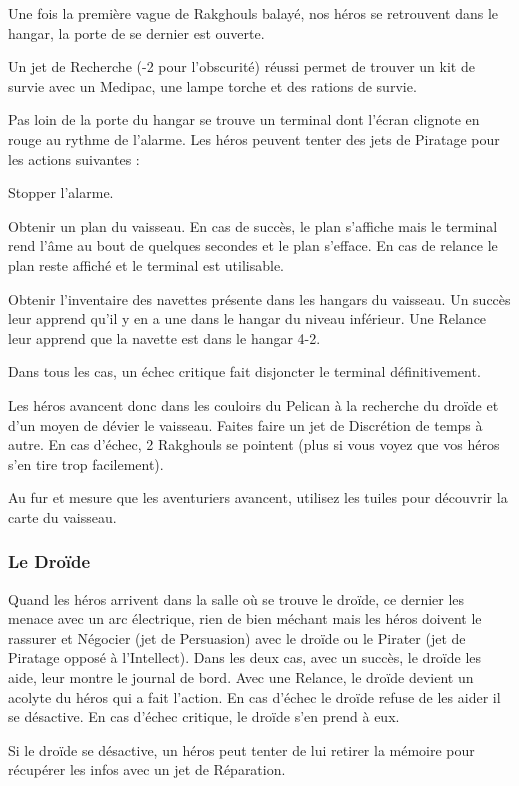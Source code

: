 Une fois la première vague de Rakghouls balayé, nos héros se retrouvent dans le hangar, la porte de se dernier est ouverte.

Un jet de Recherche (-2 pour l’obscurité) réussi permet de trouver un kit de survie avec un Medipac, une lampe torche et des rations de survie.

Pas loin de la porte du hangar se trouve un terminal dont l’écran clignote en rouge au rythme de l’alarme. Les héros peuvent tenter des jets de Piratage pour les actions suivantes :
\begin{rebelist}
	\item Stopper l’alarme. 
	\item Obtenir un plan du vaisseau. En cas de succès, le plan s’affiche mais le terminal rend l’âme au bout de quelques secondes et le plan s’efface. En cas de relance le plan reste affiché et le terminal est utilisable.
	\item Obtenir l’inventaire des navettes présente dans les hangars du vaisseau. Un succès leur apprend qu’il y en a une dans le hangar du niveau inférieur. Une Relance leur apprend que la navette est dans le hangar 4-2.
\end{rebelist}
Dans tous les cas, un échec critique fait disjoncter le terminal définitivement.

Les héros avancent donc dans les couloirs du Pelican à la recherche du droïde et d’un moyen de dévier le vaisseau. Faites faire un jet de Discrétion de temps à autre. En cas d’échec, 2 Rakghouls se pointent (plus si vous voyez que vos héros s’en tire trop facilement).

Au fur et mesure que les aventuriers avancent, utilisez les tuiles pour découvrir la carte du vaisseau.

\subsubsection{Le Droïde}
Quand les héros arrivent dans la salle où se trouve le droïde, ce dernier les menace avec un arc électrique, rien de bien méchant mais les héros doivent le rassurer et Négocier (jet de Persuasion) avec le droïde ou le Pirater (jet de Piratage opposé à l’Intellect). Dans les deux cas, avec un succès, le droïde les aide, leur montre le journal de bord. Avec une Relance, le droïde devient un acolyte du héros qui a fait l’action. En cas d’échec le droïde refuse de les aider il se désactive. En cas d’échec critique, le droïde s’en prend à eux.

Si le droïde se désactive, un héros peut tenter de lui retirer la mémoire pour récupérer les infos avec un jet de Réparation. 

